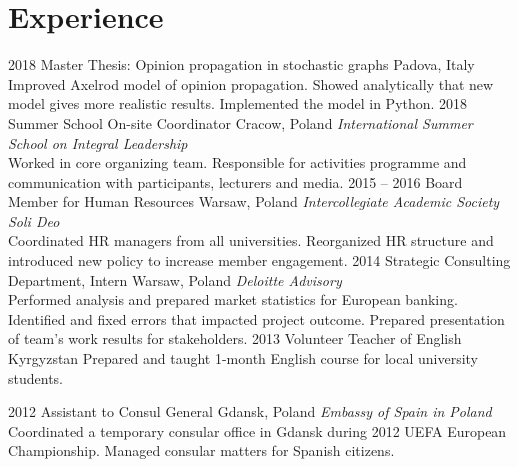 \documentclass[]{appsilon} %
\begin{document}
\vspace{0cm}
\section{Experience}

\begin{entrylist}
\entry
{2018}
{Master Thesis: Opinion propagation in stochastic graphs}
{Padova, Italy}
{Improved Axelrod model of opinion propagation. Showed analytically that new model gives more realistic results. Implemented the model in Python.}
\entry
{2018}
{Summer School On-site Coordinator}
{Cracow, Poland}
{\emph{International Summer School on Integral Leadership} \\
	Worked in core organizing team. Responsible for activities programme and communication with participants, lecturers and media.}
\entry
{2015 -- 2016}
{Board Member for Human Resources}
{Warsaw, Poland}
{\emph{Intercollegiate Academic Society Soli Deo} \\
Coordinated HR managers from all universities. Reorganized HR structure and introduced new policy to increase member engagement.
}
\entry
{2014}
{Strategic Consulting Department, Intern}
{Warsaw, Poland}
{\emph{Deloitte Advisory} \\
Performed analysis and prepared market statistics for European banking. Identified and fixed errors that impacted project outcome. Prepared presentation of team's work results for stakeholders. }
\entry
{2013}
{Volunteer Teacher of English}
{Kyrgyzstan}
{Prepared and taught 1-month English course for local university students.}

\entry
{2012}
{Assistant to Consul General}
{Gdansk, Poland}
{\emph{Embassy of Spain in Poland} \\
Coordinated a temporary consular office in Gdansk during 2012 UEFA European Championship. Managed consular matters for Spanish citizens.  
}
\end{entrylist}


\end{document}
